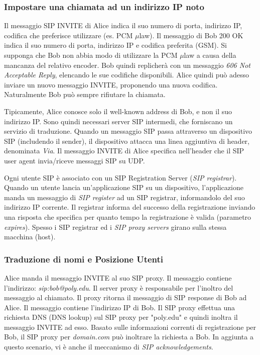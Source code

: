 \begin{itemize}
\subsubsection{Impostare una chiamata ad un indirizzo IP noto}

Il messaggio SIP INVITE di Alice indica il suo numero di porta, indirizzo IP, codifica che preferisce utilizzare (es. PCM $\mu$law). Il messaggio di Bob 200 OK indica il suo numero di porta, indirizzo IP e codifica preferita (GSM). Si supponga che Bob non abbia modo di utilizzare la PCM $\mu$law a causa della mancanza del relativo encoder. Bob quindi replicherà con un messaggio \textit{606 Not Acceptable Reply}, elencando le sue codifiche disponibili. Alice quindi può adesso inviare un nuovo messaggio INVITE, proponendo una nuova codifica. Naturalmente Bob può sempre rifiutare la chiamata. 

Tipicamente, Alice conosce solo il well-known address di Bob, e non il suo indirizzo IP. Sono quindi necessari server SIP intermedi, che forniscano un servizio di traduzione. Quando un messaggio SIP passa attraverso un dispositivo SIP (includendo il sender), il dispositivo attacca una linea aggiuntiva di header, denominata \textit{Via}. Il messaggio INVITE di Alice specifica nell'header che il SIP user agent invia/riceve messaggi SIP su UDP.

Ogni utente SIP è associato con un SIP Registration Server (\textit{SIP registrar}). Quando un utente lancia un'applicazione SIP su un dispositivo, l'applicazione manda un messaggio di \textit{SIP register} ad un SIP registrar, informandolo del suo indirizzo IP corrente. Il registrar informa del successo della registrazione inviando una risposta che specifica per quanto tempo la registrazione è valida (parametro \textit{expires}). Spesso i SIP registrar ed i \textit{SIP proxy servers} girano sulla stessa macchina (host).

\subsubsection{Traduzione di nomi e Posizione Utenti}

Alice manda il messaggio INVITE al suo SIP proxy. Il messaggio contiene l'indirizzo: \textit{sip:bob@poly.edu}. Il server proxy è responsabile per l'inoltro del messaggio al chiamato. Il proxy ritorna il messaggio di SIP response di Bob ad Alice. Il messaggio contiene l'indirizzo IP di Bob. Il SIP proxy effettua una richiesta DNS (DNS lookup) sul SIP proxy per "poly.edu" e quindi inoltra il messaggio INVITE ad esso. Basato sulle informazioni correnti di registrazione per Bob, il SIP proxy per \textit{domain.com} può inoltrare la richiesta a Bob. In aggiunta a questo scenario, vi è anche il meccanismo di \textit{SIP acknowledgements}.


\end{itemize}
